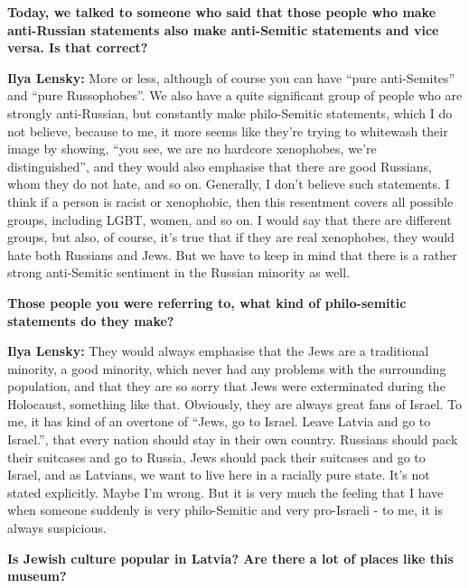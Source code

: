 \textbf{Today, we talked to someone who said that those people who make anti-Russian statements also make anti-Semitic statements and vice versa. Is that correct?}

\textbf{Ilya Lensky:} More or less, although of course you can have ``pure anti-Semites'' and ``pure Russophobes''. We also have a quite significant group of people who are strongly anti-Russian, but constantly make philo-Semitic statements, which I do not believe, because to me, it more seems like they’re trying to whitewash their image by showing, ``you see, we are no hardcore xenophobes, we’re distinguished'', and they would also emphasise that there are good Russians, whom they do not hate, and so on. Generally, I don’t believe such statements. I think if a person is racist or xenophobic, then this resentment covers all possible groups, including LGBT, women, and so on. I would say that there are different groups, but also, of course, it’s true that if they are real xenophobes, they would hate both Russians and Jews. But we have to keep in mind that there is a rather strong anti-Semitic sentiment in the Russian minority as well. 

\textbf{Those people you were referring to, what kind of philo-semitic statements do they make?} 

\textbf{Ilya Lensky:} They would always emphasise that the Jews are a traditional minority, a good minority, which never had any problems with the surrounding population, and that they are so sorry that Jews were exterminated during the Holocaust, something like that. Obviously, they are always great fans of Israel. To me, it has kind of an overtone of  ``Jews, go to Israel. Leave Latvia and go to Israel.'', that every nation should stay in their own country. Russians should pack their suitcases and go to Russia, Jews should pack their suitcases and go to Israel, and as Latvians, we want to live here in a racially pure state. It’s not stated explicitly. Maybe I’m wrong. But it is very much the feeling that I have when someone suddenly is very philo-Semitic and very pro-Israeli - to me, it is always suspicious. 

\textbf{Is Jewish culture popular in Latvia? Are there a lot of places like this museum?}


